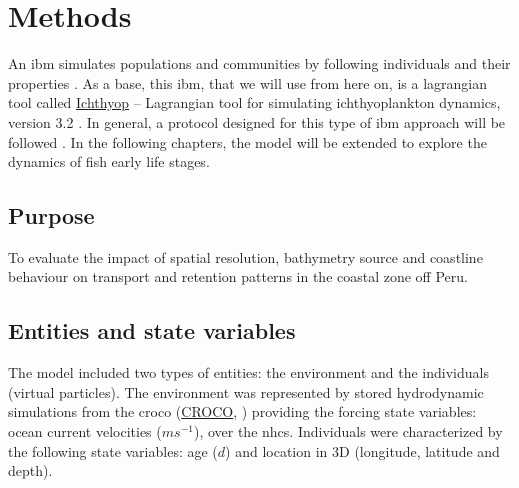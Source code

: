 \clearpage
\section{Methods}\label{Chap2Meth}

An \acrfull{ibm} simulates populations and communities by following individuals and their properties \citep{DeanGrim2014}. As a base, this \acrshort{ibm}, that we will use from here on, is a lagrangian tool called \href{https://ichthyop.org/}{Ichthyop} – Lagrangian tool for simulating ichthyoplankton dynamics, version 3.2 \citep{LettVerl2008}. In general, a protocol designed for this type of \acrshort{ibm} approach will be followed \citep{GrimBerg2006,GrimBerg2010}. In the following chapters, the model will be extended to explore the dynamics of fish early life stages.\\

\subsection{Purpose}\label{Chap2MethPurp}

To evaluate the impact of spatial resolution, bathymetry source and coastline behaviour on transport and retention patterns in the coastal zone off Peru.\\

\subsection{Entities and state variables}\label{Chap2MethEnti}

The model included two types of entities: the environment and the individuals (virtual particles). The environment was represented by stored hydrodynamic simulations from the \acrlong{croco} (\href{https://www.croco-ocean.org/}{CROCO}, \cite{HiltAucl2020,ShchMcwi2005}) providing the forcing state variables: ocean current velocities ($ms^{-1}$), over the \acrshort{nhcs}. Individuals were characterized by the following state variables: age ($d$) and location in 3D (longitude, latitude and depth).\\

